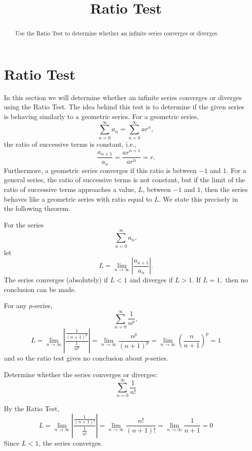 \documentclass{ximera}
\title{Ratio Test}
\begin{document}
\begin{abstract}
Use the Ratio Test to determine whether an infinite series converges or diverges.
\end{abstract}

\maketitle

\section{Ratio Test}

In this section we will determine whether an infinite series converges or diverges using the Ratio Test. 
The idea behind this test is to determine if the given series is behaving similarly to a geometric series.
For a geometric series, 
\[
\sum_{n=0}^\infty a_n = \sum_{n=0}^\infty ar^n,
\]
the ratio of successive terms is constant, i.e., 
\[
\frac{a_{n+1}}{a_n} = \frac{ar^{n+1}}{ar^n} = r.
\]
Furthermore, a geometric series converges if this ratio is between $-1$ and $1$.
For a general series, the ratio of successive terms is not constant, but if the limit of the ratio of successive terms
approaches a value, $L$, between $-1$ and $1$, then the series behaves like a geometric series with ratio equal to $L$.
We state this precisely in the following theorem.

\begin{theorem}
For the series
\[
\sum_{n=0}^\infty a_n,
\]
let
\[
L = \lim_{n \to \infty} \left|\frac{a_{n+1}}{a_n}\right|.
\]
The series converges (absolutely) if $L < 1$ and diverges if $L>1$. 
If $L = 1,$ then no conclusion can be made.

\end{theorem}
 
\begin{remark}
For any $p$-series,
\[
\sum_{n=0}^\infty \frac{1}{n^p},
\]
\[
L =  \lim_{n \to \infty} \left|\frac{\frac{1}{(n+1)^p}}{\frac{1}{n^p}}\right| = \lim_{n \to \infty} \frac{n^p}{(n+1)^p} =  \lim_{n \to \infty} \left(\frac{n}{n+1}\right)^p = 1
\]
and so the ratio test gives no conclusion about $p$-series.
\end{remark}

\begin{example}
Determine whether the series converges or diverges:
\[
\sum_{n=0}^\infty \frac{1}{n!}
\]

By the Ratio Test,
\[
L =  \lim_{n \to \infty} \left|\frac{\frac{1}{(n+1)!}}{\frac{1}{n!}}\right| =  \lim_{n \to \infty} \frac{n!}{(n+1)!} =  \lim_{n \to \infty} \frac{1}{n+1} = 0
\]
Since $L < 1$, the series converges.
\end{example}
\end{document}
